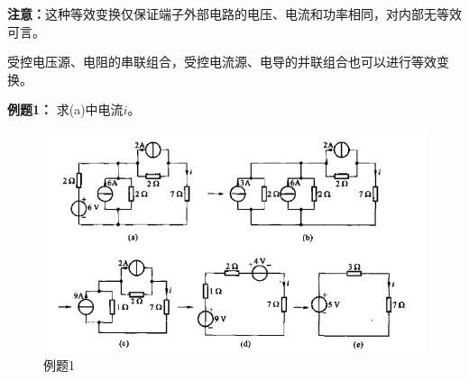 \documentclass[11pt,a4paper,oneside]{book}
\begin{document}
\noindent\textbf{注意：}这种等效变换仅保证端子外部电路的电压、电流和功率相同，对内部无等效可言。

受控电压源、电阻的串联组合，受控电流源、电导的并联组合也可以进行等效变换。

\noindent \textbf{例题1：}
求(a)中电流$i$。
\begin{figure}[H]
	\centering
	\includegraphics[width=0.5\linewidth]{screenshot018}
	\caption{例题1}
	\label{fig:screenshot018}
\end{figure}
\end{document}
